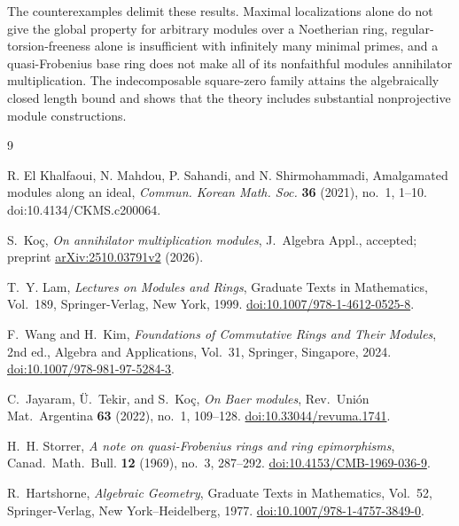 \documentclass[11pt]{amsart}
\theoremstyle{plain}
\theoremstyle{definition}
\theoremstyle{remark}
\numberwithin{equation}{section}
\begin{document}
The counterexamples delimit these results. Maximal localizations alone
do not give the global property for arbitrary modules over a Noetherian
ring, regular-torsion-freeness alone is insufficient with infinitely many
minimal primes, and a quasi-Frobenius base ring does not make all of its
nonfaithful modules annihilator multiplication.
The indecomposable square-zero family attains the algebraically closed
length bound and shows that the theory includes substantial nonprojective
module constructions.

\begin{thebibliography}{9}

R. El Khalfaoui, N. Mahdou, P. Sahandi, and N. Shirmohammadi,
Amalgamated modules along an ideal,
\emph{Commun. Korean Math. Soc.} \textbf{36} (2021), no.~1, 1--10.
doi:10.4134/CKMS.c200064.

S.~Ko\c{c}, \emph{On annihilator multiplication modules},
J.~Algebra Appl., accepted; preprint
\href{https://arxiv.org/abs/2510.03791v2}{arXiv:2510.03791v2} (2026).

T.~Y. Lam, \emph{Lectures on Modules and Rings},
Graduate Texts in Mathematics, Vol.~189,
Springer-Verlag, New York, 1999.
\href{https://doi.org/10.1007/978-1-4612-0525-8}{doi:10.1007/978-1-4612-0525-8}.

F.~Wang and H.~Kim,
\emph{Foundations of Commutative Rings and Their Modules}, 2nd ed.,
Algebra and Applications, Vol.~31,
Springer, Singapore, 2024.
\href{https://doi.org/10.1007/978-981-97-5284-3}{doi:10.1007/978-981-97-5284-3}.


C.~Jayaram, \"U.~Tekir, and S.~Ko\c{c},
\emph{On Baer modules}, Rev.~Uni\'on Mat.~Argentina \textbf{63} (2022),
no.~1, 109--128.
\href{https://doi.org/10.33044/revuma.1741}{doi:10.33044/revuma.1741}.

H.~H. Storrer, \emph{A note on quasi-Frobenius rings and ring epimorphisms},
Canad.~Math.~Bull. \textbf{12} (1969), no.~3, 287--292.
\href{https://doi.org/10.4153/CMB-1969-036-9}{doi:10.4153/CMB-1969-036-9}.

R.~Hartshorne, \emph{Algebraic Geometry},
Graduate Texts in Mathematics, Vol.~52,
Springer-Verlag, New York--Heidelberg, 1977.
\href{https://doi.org/10.1007/978-1-4757-3849-0}{doi:10.1007/978-1-4757-3849-0}.

\end{thebibliography}
\end{document}
